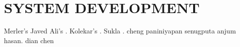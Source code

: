 
\chapter{SYSTEM DEVELOPMENT} %
Merler's \cite{8491305}
Javed Ali's \cite{7479531}.
Kolekar's \cite{7101847}.
Sukla \cite{8575397}.
cheng \cite{1632043}
paniniyapan\cite{4756096}
senugputa\cite{canalysis} 
anjum\cite{6731340}
hasan\cite{Hasan2013}.
dian chen\cite{Tjondronegoro:2003:SVS:973264.973296}
